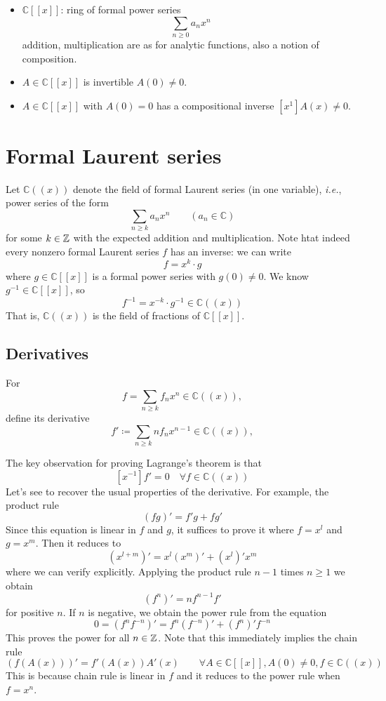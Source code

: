\begin{itemize}
    \item \(\mathbb{C}[[x]]\): ring of formal power series
    \[ \sum_{n\geq0}a_n x^n \]
    addition, multiplication are as for analytic functions, also a notion of composition.
    \item \(A\in\mathbb{C}[[x]]\) is invertible \iff \(A(0)\neq0\).
    \item \(A\in\mathbb{C}[[x]]\) with \(A(0)=0\) has a compositional inverse \iff \(\left[x^1\right]A(x)\neq0\).
\end{itemize}

\section{Formal Laurent series}
\begin{definition}
Let \(\mathbb{C}((x))\) denote the field of formal Laurent series (in one variable), \textit{i.e.}, power series of the form
\[ \sum_{n\geq k}a_n x^n \qquad (a_n\in\mathbb{C}) \]
for some \(k\in\mathbb{Z}\) with the expected addition and multiplication.
Note htat indeed every nonzero formal Laurent series \(f\) has an inverse:
we can write
\[ f= x^k\cdot g \]
where \(g\in\mathbb{C}[[x]]\) is a formal power series with \(g(0)\neq0\).
We know \(g^{-1}\in\mathbb{C}[[x]]\), so
\[ f^{-1}=x^{-k}\cdot g^{-1}\in\mathbb{C}((x)) \]
That is, \(\mathbb{C}((x))\) is the field of fractions of \(\mathbb{C}[[x]]\).
\end{definition}

\subsection{Derivatives}
\begin{definition}[derivative]
For
\[ f=\sum_{n\geq k}f_n x^n\in\mathbb{C}((x)), \]
define its derivative
\[ f'\coloneqq\sum_{n\geq k}nf_n x^{n-1}\in\mathbb{C}((x)), \]
\end{definition}
The key observation for proving Lagrange's theorem is that
\[ \left[x^{-1}\right]f'=0 \quad \forall f\in\mathbb{C}((x)) \]
Let's see to recover the usual properties of the derivative.
For example, the product rule
\[ (fg)'=f'g+fg' \]
Since this equation is linear in \(f\) and \(g\), it suffices to prove it where \(f=x^l\) and \(g=x^m\).
Then it reduces to
\[ \left(x^{l+m}\right)'=x^l\left(x^m\right)'+\left(x^l\right)'x^m \]
where we can verify explicitly.
Applying the product rule \(n-1\) times \(n\geq1\) we obtain
\[ \left(f^n\right)'=nf^{n-1}f' \]
for positive \(n\).
If \(n\) is negative, we obtain the power rule from the equation
\[ 0=\left(f^n f^{-n}\right)'=f^n\left(f^{-n}\right)'+\left(f^n\right)'f^{-n} \]
This proves the power for all \(n\in\mathbb{Z}\).
Note that this immediately implies the chain rule
\[ \left(f(A(x))\right)'=f'(A(x))A'(x) \qquad \forall A\in\mathbb{C}[[x]],A(0)\neq0,f\in\mathbb{C}((x)) \]
This is because chain rule is linear in \(f\) and it reduces to the power rule when \(f=x^n\).

